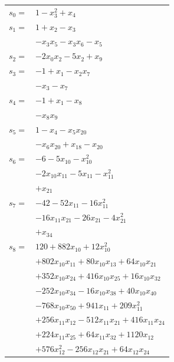 \begingroup
\small
\setlength{\tabcolsep}{2pt}
\setlength{\LTleft}{0pt}
\begin{longtable}{@{}r@{\;}l@{}}
\(s_{0}=\) & \(\displaystyle 1 -x_{3}^{2} +x_{4}\) \\[3pt]
\(s_{1}=\) & \(\displaystyle 1 +x_{2} -x_{3}\) \\
 & \(\displaystyle -x_{3}x_{5} -x_{3}x_{6} -x_{5}\) \\[3pt]
\(s_{2}=\) & \(\displaystyle -2x_{0}x_{2} -5x_{2} +x_{9}\) \\[3pt]
\(s_{3}=\) & \(\displaystyle -1 +x_{1} -x_{2}x_{7}\) \\
 & \(\displaystyle -x_{3} -x_{7}\) \\[3pt]
\(s_{4}=\) & \(\displaystyle -1 +x_{1} -x_{8}\) \\
 & \(\displaystyle -x_{8}x_{9}\) \\[3pt]
\(s_{5}=\) & \(\displaystyle 1 -x_{4} -x_{5}x_{20}\) \\
 & \(\displaystyle -x_{6}x_{20} +x_{18} -x_{20}\) \\[3pt]
\(s_{6}=\) & \(\displaystyle -6 -5x_{10} -x_{10}^{2}\) \\
 & \(\displaystyle -2x_{10}x_{11} -5x_{11} -x_{11}^{2}\) \\
 & \(\displaystyle +x_{21}\) \\[3pt]
\(s_{7}=\) & \(\displaystyle -42 -52x_{11} -16x_{11}^{2}\) \\
 & \(\displaystyle -16x_{11}x_{21} -26x_{21} -4x_{21}^{2}\) \\
 & \(\displaystyle +x_{34}\) \\[3pt]
\(s_{8}=\) & \(\displaystyle 120 +882x_{10} +12x_{10}^{2}\) \\
 & \(\displaystyle +802x_{10}x_{11} +80x_{10}x_{13} +64x_{10}x_{21}\) \\
 & \(\displaystyle +352x_{10}x_{24} +416x_{10}x_{25} +16x_{10}x_{32}\) \\
 & \(\displaystyle -252x_{10}x_{34} -16x_{10}x_{38} +40x_{10}x_{40}\) \\
 & \(\displaystyle -768x_{10}x_{50} +941x_{11} +209x_{11}^{2}\) \\
 & \(\displaystyle +256x_{11}x_{12} -512x_{11}x_{21} +416x_{11}x_{24}\) \\
 & \(\displaystyle +224x_{11}x_{25} +64x_{11}x_{32} +1120x_{12}\) \\
 & \(\displaystyle +576x_{12}^{2} -256x_{12}x_{21} +64x_{12}x_{24}\) \\

\end{longtable}
